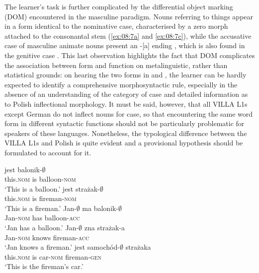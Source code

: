 The learner’s task is further complicated by the differential object marking (DOM) encountered in the masculine paradigm. Nouns referring to things appear in a form identical to the nominative case, characterised by a zero morph attached to the consonantal stem (\ref{ex:08:7a} and \ref{ex:08:7c}), while the accusative case of masculine animate nouns  present an -[a] ending , which is also found in the genitive case . This last observation highlights the fact that DOM complicates the association between form and function on metalinguistic, rather than statistical grounds: on hearing the two forms in  and , the learner can be hardly expected to identify a comprehensive morphosyntactic rule, especially in the absence of an understanding of the category of case and detailed information as to Polish inflectional morphology. It must be said, however, that all VILLA L1s except German do not inflect nouns for case, so that encountering the same word form in different syntactic functions should not be particularly problematic for speakers of these languages. Nonetheless, the typological difference between the VILLA L1s and Polish is quite evident and a provisional hypothesis should be formulated to account for it. 

\ea%
    \label{ex:08:7}
    \ea\label{ex:08:7a}
        {jest}  {balonik{}-${\emptyset}$}\\
            this\textsc{.nom}  is  balloon\textsc{-nom}\\
    \glt    ‘This is a balloon.’
    \ex\label{ex:08:7b}
        {jest}  {strażak-${\emptyset}$}\\
            this\textsc{.nom}  is  fireman\textsc{-nom}\\
    \glt    ‘This is a fireman.’
    \ex\label{ex:08:7c}
    \gll    Jan-${\emptyset}$    ma  balonik-${\emptyset}$\\
            Jan\textsc{-nom}  has  balloon\textsc{-acc}\\
    \glt    ‘Jan has a balloon.’
    \ex\label{ex:08:7d}
    \gll    Jan-${\emptyset}$    zna  strażak-a\\
            Jan\textsc{-nom}  knows  fireman\textsc{-acc}\\
    \glt    ‘Jan knows a fireman.’
    \ex\label{ex:08:7e}
        {jest}  {samochód-${\emptyset}$}  {strażaka}\\
            this\textsc{.nom}  is  car\textsc{-nom}  fireman\textsc{-gen}\\
    \glt    ‘This is the fireman's car.’
    \z
\z

